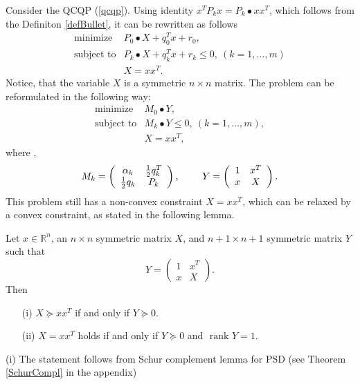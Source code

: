 \documentclass[12pt]{book}
\theoremstyle{definition}
\begin{document}
Consider the QCQP (\ref{qcqp}). Using identity $x^TP_kx = P_k\bullet xx^T$, which follows from the Definiton \ref{defBullet}, it can be rewritten as follows
\begin{equation} 
\label{1stStepToSDPr}
\begin{array}{ll}
\mbox{minimize}& P_0\bullet X + q_0^Tx +r_0, \\
\mbox{subject to}& P_k\bullet X+ q_k^Tx + r_k  \leq 0, \  (k = 1,\dots ,m)\\
& X = xx^T.
\end{array} 
\end{equation}
Notice, that the variable $X$ is a symmetric $n\times n$ matrix. 
 The problem can be reformulated in the following way:
 \begin{equation} 
\label{2ndStepToSDPr}
\begin{array}{ll}
\mbox{minimize}& M_0\bullet Y, \\
\mbox{subject to}& M_k\bullet Y \leq 0, \  (k = 1,\dots ,m),\\
& X = xx^T,
\end{array} 
\end{equation}
 where , 
\begin{equation}
M_k = \left(
\begin{array}{cc}
\alpha_k & {1\over 2}q_k^T \\
{1\over 2}q_k & P_k
\end{array}\right), 
\ \ \ \ \ \ \
Y =  \left(
\begin{array}{cc}
1 & x^T \\
x & X
\end{array}\right).
\end{equation}
 This problem still has a non-convex constraint $X = xx^T$, which can be relaxed by a convex constraint, as stated in the following lemma.
  
\lema 
\label{relaxRank1Lemma}
Let $x\in \mathbb{R}^n$, an $n\times n$ symmetric matrix $X$, and $n+1\times n+1$ symmetric matrix $Y$ such that 
$$Y =  \left(
\begin{array}{cc}
1 & x^T \\
x & X
\end{array}\right). 
$$  Then
\begin{itemize}
\item[(i)] $X\succeq xx^T$ if and only if $Y\succeq 0$.
\item[(ii)] $X=xx^T$ holds if and only if $Y\succeq 0$ and \rm $\mbox{ rank } Y=1$. 
\end{itemize}
\proof (i) The statement follows from Schur complement lemma for PSD (see Theorem \ref{SchurCompl} in the appendix) 
\end{document}
